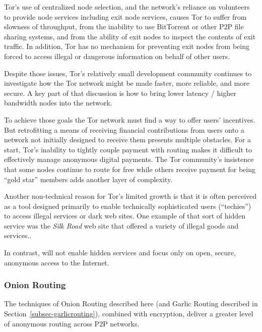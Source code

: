 
Tor's use of centralized node selection, and the network's reliance on volunteers to provide node services including exit node services, causes Tor to suffer from slowness of throughput, from the inability to use BitTorrent or other P2P file sharing systems, and from the ability of exit nodes to inspect the contents of exit traffic. In addition, Tor has no mechanism for preventing exit nodes from being forced to access illegal or dangerous information on behalf of other users.

Despite those issues, Tor's relatively small development community continues to investigate how the Tor network might be made faster, more reliable, and more secure\cite{25}. A key part of that discussion is how to bring lower latency / higher bandwidth nodes into the network\cite{20, 21, 22, 23, 24}.

To achieve those goals the Tor network must find a way to offer users' incentives. But  retrofitting a means of receiving financial contributions from users onto a network not initially designed to receive them presents multiple obstacles. For a start, Tor's inability to tightly couple payment with routing makes it difficult to effectively manage anonymous digital payments. The Tor community's insistence that some nodes continue to route for free while others receive payment for being “gold star” members adds another layer of complexity.

Another non-technical reason for Tor’s limited growth is that it is often perceived as a tool designed primarily to enable technically sophisticated users (``techies'') to access illegal services or dark web sites. One example of that sort of hidden service was the \textit{Silk Road} web site that offered a variety of illegal goods and services.\cite{18,19}.

In contrast, \orchid{} will not enable hidden services and focus only on open, secure, anonymous access to the Internet.

\subsubsection{Onion Routing}
\label{subsec-onionrouting}
The techniques of Onion Routing described here (and Garlic Routing described in Section~\ref{subsec-garlicrouting}), combined with encryption, deliver a greater level of anonymous routing across P2P networks.

